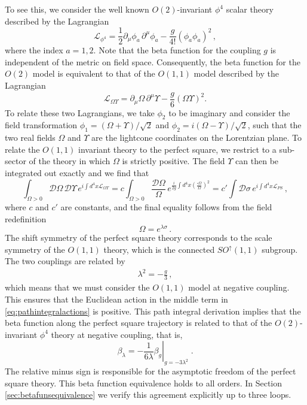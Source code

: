 \documentclass[a4paper,11pt]{article}
\begin{document}
To see this, we consider the well known $O(2)$-invariant $\phi^4$ scalar theory described by the Lagrangian
\begin{equation}\label{eq:phi4}
	\mathcal{L}_{\phi^4}= \frac{1}{2} \partial_\mu \phi_a\,\partial^\mu \phi_a - \frac{g}{4!} (\phi_a \phi_a)^2 \,,
\end{equation}
where the index $a=1,2$. Note that the beta function for the coupling $g$ is independent of the metric on field space. Consequently, the beta function for the $O(2)$ model is equivalent to that of the $O(1,1)$ model described by the Lagrangian
\begin{equation}\label{eq:OY}
    \mathcal{L}_{\Omega \Upsilon} = \partial_\mu \Omega \, \partial^\mu \Upsilon - \frac{g}{6} (\Omega \Upsilon )^2.
\end{equation}
To relate these two Lagrangians, we take $\phi_2$ to be imaginary and consider the field transformation $\phi_1=(\Omega+\Upsilon)/\sqrt{2}$ and $\phi_2=i(\Omega-\Upsilon)/\sqrt{2}$, such that the two real fields $\Omega$ and $\Upsilon$ are the lightcone coordinates on the Lorentzian plane. To relate the $O(1,1)$ invariant theory to the perfect square, we restrict to a sub-sector of the theory in which $\Omega$ is strictly positive. The field $\Upsilon$ can then be integrated out exactly and we find that
\begin{equation}
\label{eq:pathintegralactions}
    \int_{\Omega>0}\mathcal{D}\Omega\,\mathcal{D}\Upsilon \,e^{i\int d^4x \mathcal{L}_{\Omega\Upsilon}} = c \int_{\Omega>0}\frac{\mathcal{D}\Omega}{\Omega}\, e^{\frac{i}{2g}\int d^4x \left(\frac{\square\Omega}{\Omega}\right)^2} = c' \int \mathcal{D}\sigma \, e^{i \int d^4x \mathcal{L}_{PS}} \,,
\end{equation}
where $c$ and $c'$ are constants, and the final equality follows from the field redefinition 
\begin{equation}\label{eq:fieldrefefiniton}
    \Omega=e^{\lambda\sigma} \,.
\end{equation} The shift symmetry of the perfect square theory corresponds to the scale symmetry of the $O(1,1)$ theory, which is the connected $SO^\uparrow(1,1)$ subgroup. The two couplings are related by
\begin{eqnarray}
    \lambda^2 = -\frac{g}{3}\,,
\end{eqnarray}
which means that we must consider the $O(1,1)$ model at negative coupling. This ensures that the Euclidean action in the middle term in \cref{eq:pathintegralactions} is positive. This path integral derivation implies that the beta function along the perfect square trajectory is related to that of the $O(2)$-invariant $\phi^4$ theory at negative coupling, that is,
\begin{equation}\label{eq:equivalencebetarelationship}
   \left. \beta_\lambda = - \frac{1}{6\lambda}\beta_g \right|_{g = - 3\lambda^2 } \;.
\end{equation}
The relative minus sign is responsible for the asymptotic freedom of the perfect square theory. This beta function equivalence holds to all orders. In Section \ref{sec:betafunsequivalence} we verify this agreement explicitly up to three loops.
\end{document}
